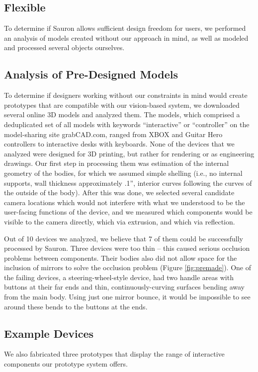     \subsection{Flexible}
    
    To determine if Sauron allows sufficient design freedom for users, we performed an analysis of models created without our approach in mind, as well as modeled and processed several objects ourselves.
    
    \subsection{Analysis of Pre-Designed Models}
    To determine if designers working without our constraints in mind would create prototypes that are compatible with our vision-based system, we downloaded several online 3D models and analyzed them. The models, which comprised a deduplicated set of all models with keywords ``interactive'' or ``controller'' on the model-sharing site grabCAD.com, ranged from XBOX and Guitar Hero controllers to interactive desks with keyboards. None of the devices that we analyzed were designed for 3D printing, but rather for rendering or as engineering drawings.  Our first step in processing them was estimation of the internal geometry of the bodies, for which we assumed simple shelling (i.e., no internal supports, wall thickness approximately .1'', interior curves following the curves of the outside of the body). After this was done, we selected several candidate camera locations which would not interfere with what we understood to be the user-facing functions of the device, and we measured which components would be visible to the camera directly, which via extrusion, and which via reflection. 

    Out of 10 devices we analyzed, we believe that 7 of them could be successfully processed by Sauron. Three devices were too thin -- this caused serious occlusion problems between components. Their bodies also did not allow space for the inclusion of mirrors to solve the occlusion problem (Figure \ref{fig:premade}). One of the failing devices, a steering-wheel-style device, had two handle areas with buttons at their far ends and thin, continuously-curving surfaces bending away from the main body. Using just one mirror bounce, it would be impossible to see around these bends to the buttons at the ends.


    \subsection{Example Devices}
    We also fabricated three prototypes that display the range of interactive components our prototype system offers.

